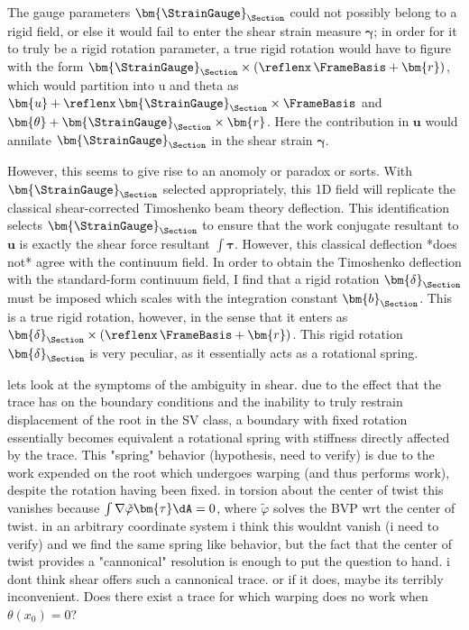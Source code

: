 \begin{remark}
The gauge parameters $\bm{\StrainGauge}_{\Section}$ could not possibly belong to a rigid field, or else it would fail to enter the shear strain measure $\bm{\gamma}$; in order for it to truly be a rigid rotation parameter, a true rigid rotation would have to figure with the form $\bm{\StrainGauge}_{\Section}\times(\reflenx\, \FrameBasis + \bm{r})$, which would partition into u and theta as $\bm{u} + \reflenx\, \bm{\StrainGauge}_{\Section}\times \FrameBasis$ and $\bm{\theta} + \bm{\StrainGauge}_{\Section}\times\bm{r}$. 
Here the contribution in $\bm{u}$ would annilate  $\bm{\StrainGauge}_{\Section}$ in the shear strain $\bm{\gamma}$. 

However, this seems to give rise to an anomoly or paradox or sorts. 
With $\bm{\StrainGauge}_{\Section}$ selected appropriately, this 1D field will replicate the classical shear-corrected Timoshenko beam theory deflection. 
This identification selects $\bm{\StrainGauge}_{\Section}$ to ensure that the work conjugate resultant to $\bm{u}$ is exactly the shear force resultant $\int \bm{\tau}$. 
However, this classical deflection *does not* agree with the continuum field. 
In order to obtain the Timoshenko deflection with the standard-form continuum field, I find that a rigid rotation $\bm{\delta}_{\Section}$ must be imposed which scales with the integration constant $\bm{b}_{\Section}$. 
This is a true rigid rotation, however, in the sense that it enters as $\bm{\delta}_{\Section}\times (\reflenx\, \FrameBasis + \bm{r})$. 
This rigid rotation $\bm{\delta}_{\Section}$ is very peculiar, as it essentially acts as a rotational spring. 
\end{remark}

\begin{remark}
lets look at the symptoms of the ambiguity in shear. due to the effect that the trace has on the boundary conditions and the inability to truly restrain displacement of the root in the SV class, a boundary with fixed rotation essentially becomes equivalent a rotational spring with stiffness directly affected by the trace. This "spring" behavior (hypothesis, need to verify) is due to the work expended on the root which undergoes warping (and thus performs work), despite the rotation having been fixed. in torsion about the center of twist this vanishes because $\int \nabla \tilde{\varphi}\bm{\tau}\dA=0$, where $\tilde\varphi$ solves the BVP wrt the center of twist. in an arbitrary coordinate system i think this wouldnt vanish (i need to verify) and we find the same spring like behavior, but the fact that the center of twist provides a "cannonical" resolution is enough to put the question to hand. i dont think shear offers such a cannonical trace. or if it does, maybe its terribly inconvenient. Does there exist a trace for which warping does no work when $\theta(x_0) = 0$?
\end{remark}

